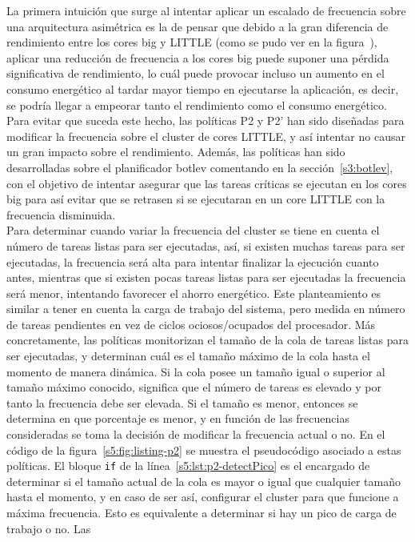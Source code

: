 La primera intuición que surge al intentar aplicar un escalado de
frecuencia sobre una arquitectura asimétrica es la de pensar que debido a
la gran diferencia de rendimiento entre los cores big y LITTLE (como se
pudo ver en la figura~), aplicar una reducción de frecuencia a
los cores big puede suponer una pérdida significativa de rendimiento, lo
cuál puede provocar incluso un aumento en el consumo energético al tardar
mayor tiempo en ejecutarse la aplicación, es decir, se podría llegar a
empeorar tanto el rendimiento como el consumo energético. Para evitar que
suceda este hecho, las políticas P2 y P2' han sido diseñadas para modificar
la frecuencia sobre el cluster de cores LITTLE, y así intentar no causar un
gran impacto sobre el rendimiento. Además, las políticas han sido
desarrolladas sobre el planificador botlev comentando en la
sección~\ref{s3:botlev}, con el objetivo de intentar asegurar que las
tareas críticas se ejecutan en los cores big para así evitar que se
retrasen si se ejecutaran en un core LITTLE con la frecuencia disminuida.\\
Para determinar cuando variar la frecuencia del cluster se tiene en cuenta
el número de tareas listas para ser ejecutadas, así, si existen muchas
tareas para ser ejecutadas, la frecuencia será alta para intentar finalizar
la ejecución cuanto antes, mientras que si existen pocas tareas listas para
ser ejecutadas la frecuencia será menor, intentando favorecer el ahorro
energético. Este planteamiento es similar a tener en cuenta la carga de
trabajo del sistema, pero medida en número de tareas pendientes en vez de
ciclos ociosos/ocupados del procesador. Más concretamente, las políticas
monitorizan el tamaño de la cola de tareas listas para ser ejecutadas, y
determinan cuál es el tamaño máximo de la cola hasta el momento de manera
dinámica. Si la cola posee un tamaño igual o superior al tamaño máximo
conocido, significa que el número de tareas es elevado y por tanto la
frecuencia debe ser elevada. Si el tamaño es menor, entonces se determina
en que porcentaje es menor, y en función de las frecuencias consideradas se
toma la decisión de modificar la frecuencia actual o no. En el código de la
figura~\ref{s5:fig:listing-p2} se muestra el pseudocódigo asociado a estas
políticas. El bloque \texttt{if} de la línea~\ref{s5:lst:p2-detectPico} es
el encargado de determinar si el tamaño actual de la cola es mayor o igual
que cualquier tamaño hasta el momento, y en caso de ser así, configurar el
cluster para que funcione a máxima frecuencia. Esto es equivalente a
determinar si hay un pico de carga de trabajo o no. Las
